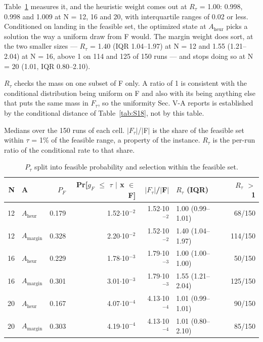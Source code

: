 \documentclass[journal]{IEEEtran}
\begin{document}
Table~\ref{tab:S17} measures it, and the heuristic weight comes out at $R_{\tau}$ = 1.00: 0.998, 0.998 and 1.009 at N = 12, 16 and 20, with interquartile ranges of 0.02 or less. Conditioned on landing in the feasible set, the optimized state at $A_{\mathrm{heur}}$ picks a solution the way a uniform draw from F would. The margin weight does sort, at the two smaller sizes --- $R_{\tau}$ = 1.40 (IQR 1.04--1.97) at N = 12 and 1.55 (1.21--2.04) at N = 16, above 1 on 114 and 125 of 150 runs --- and stops doing so at N = 20 (1.01, IQR 0.80--2.10).


$R_{\tau}$ checks the mass on one subset of F only. A ratio of 1 is consistent with the conditional distribution being uniform on F and also with its being anything else that puts the same mass in $F_{\tau}$, so the uniformity Sec. V-A reports is established by the conditional distance of Table~\ref{tab:S18}, not by this table.


Medians over the 150 runs of each cell. $|$$F_{\tau}$$|$/$|$F$|$ is the share of the feasible set within $\tau$ = 1\% of the feasible range, a property of the instance. $R_{\tau}$ is the per-run ratio of the conditional rate to that share.


\begin{table}[!t]
\centering
\scriptsize
\caption{$P_{\tau}$ split into feasible probability and selection within the feasible set.}
\label{tab:S17}
\begin{tabular}{rlrrrlr}
\toprule
N & A & $P_{F}$ & Pr[$g_{F}$ $\leq$ $\tau$ $|$ x $\in$ F] & $|$$F_{\tau}$$|$/$|$F$|$ & $R_{\tau}$ (IQR) & $R_{\tau}$ $>$ 1 \\
\midrule
12 & $A_{\mathrm{heur}}$ & 0.179 & 1.52$\cdot$10$^{-2}$ & 1.52$\cdot$10$^{-2}$ & 1.00 (0.99--1.01) & 68/150 \\
12 & $A_{\mathrm{margin}}$ & 0.328 & 2.20$\cdot$10$^{-2}$ & 1.52$\cdot$10$^{-2}$ & 1.40 (1.04--1.97) & 114/150 \\
16 & $A_{\mathrm{heur}}$ & 0.229 & 1.78$\cdot$10$^{-3}$ & 1.79$\cdot$10$^{-3}$ & 1.00 (1.00--1.00) & 50/150 \\
16 & $A_{\mathrm{margin}}$ & 0.301 & 3.01$\cdot$10$^{-3}$ & 1.79$\cdot$10$^{-3}$ & 1.55 (1.21--2.04) & 125/150 \\
20 & $A_{\mathrm{heur}}$ & 0.167 & 4.07$\cdot$10$^{-4}$ & 4.13$\cdot$10$^{-4}$ & 1.01 (0.99--1.01) & 90/150 \\
20 & $A_{\mathrm{margin}}$ & 0.303 & 4.19$\cdot$10$^{-4}$ & 4.13$\cdot$10$^{-4}$ & 1.01 (0.80--2.10) & 85/150 \\
\bottomrule
\end{tabular}
\end{table}
\end{document}
